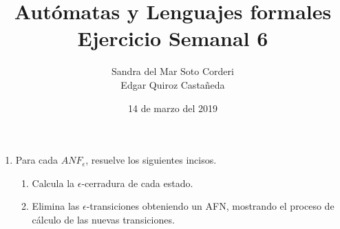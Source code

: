 \documentclass{article}
\begin{document}
    \title{
        Autómatas y Lenguajes formales \\
        Ejercicio Semanal 6
    }

    \author{
        Sandra del Mar Soto Corderi \\
        Edgar Quiroz Castañeda
    }

    \date{
        14 de marzo del 2019
    }
    
    \maketitle

    \begin{enumerate}
        \item {
            Para cada 	$ANF_{\epsilon}$, resuelve los siguientes incisos.
            \begin{enumerate}
                \item Calcula la $\epsilon$-cerradura de cada estado.\\
                
                \item Elimina las $\epsilon$-transiciones obteniendo un AFN, mostrando el proceso de cálculo de las nuevas transiciones.\\
            \end{enumerate}
        }
       \end{enumerate}
\end{document}
